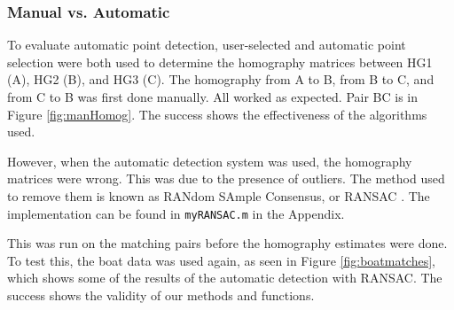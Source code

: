 \documentclass[a4paper, 10pt, conference]{ieeeconf}
\begin{document}
\subsubsection{Manual vs. Automatic}
To evaluate automatic point detection, user-selected and automatic point selection were both used to determine the homography matrices between HG1 (A), HG2 (B), and HG3 (C). The homography from A to B, from B to C, and from C to B was first done manually. All worked as expected. Pair BC is in Figure \ref{fig:manHomog}. The success shows the effectiveness of the algorithms used.

However, when the automatic detection system was used, the homography matrices were wrong. This was due to the presence of outliers. The method used to remove them is known as RANdom SAmple Consensus, or RANSAC \cite{ransac}. The implementation can be found in \texttt{myRANSAC.m} in the Appendix.

This was run on the matching pairs before the homography estimates were done. To test this, the boat data was used again, as seen in Figure \ref{fig:boatmatches}, which shows some of the results of the automatic detection with RANSAC. The success shows the validity of our methods and functions.
\end{document}
